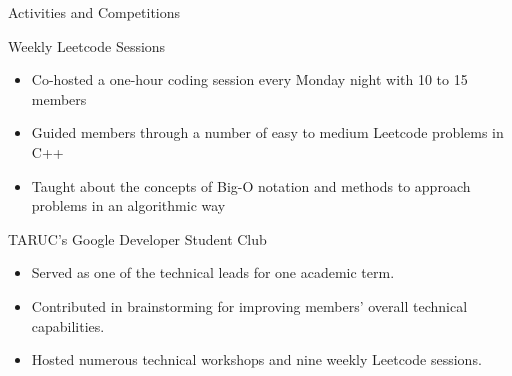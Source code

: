 \documentclass{article}
\newlength{\tabin}
\newlength{\secsep}
\newcommand{\lineunder}{\vspace*{-8pt} \\ \hspace*{-6pt} \hrulefill \\ \vspace*{-15pt}}
\newenvironment{tabbedsection}[1]{
  \begin{list}{}{
      \setlength{\itemsep}{0pt}
      \setlength{\labelsep}{0pt}
      \setlength{\labelwidth}{0pt}
      \setlength{\leftmargin}{\tabin}
      \setlength{\rightmargin}{\tabin}
      \setlength{\listparindent}{0pt}
      \setlength{\parsep}{0pt}
      \setlength{\parskip}{0pt}
      \setlength{\partopsep}{0pt}
      \setlength{\topsep}{#1}
    }
  \item[]
}{\end{list}}
\newenvironment{resume_section}[1]{
  \filbreak
  \vspace{2\secsep}
  \textsc{\large#1}
  \lineunder
  \begin{tabbedsection}{\secsep}
}{\end{tabbedsection}}
\newenvironment{resume_subsection}[2][]{
  \textbf{#2} \hfill {\footnotesize #1} \hspace{2em}
  \begin{tabbedsection}{0.5\secsep}
}{\end{tabbedsection}}
\newenvironment{subitems}{
  \renewcommand{\labelitemi}{-}
  \begin{itemize}
      \setlength{\labelsep}{1em}
}{\end{itemize}}
\begin{document}
\begin{resume_section}{Activities and Competitions}
  \begin{resume_subsection}{{Weekly Leetcode Sessions}}
    \begin{subitems}
      \item Co-hosted a one-hour coding session every Monday night with 10 to 15 members
      \item Guided members through a number of easy to medium Leetcode problems in C++
      \item Taught about the concepts of Big-O notation and methods to approach problems in an algorithmic way
    \end{subitems}
  \end{resume_subsection}


  \begin{resume_subsection}{{TARUC's Google Developer Student Club}}
    \begin{subitems}
      \item Served as one of the technical leads for one academic term.
      \item Contributed in brainstorming for improving members' overall technical capabilities.
      \item Hosted numerous technical workshops and nine weekly Leetcode sessions.
    \end{subitems}
  \end{resume_subsection}



\end{resume_section}
\end{document}
